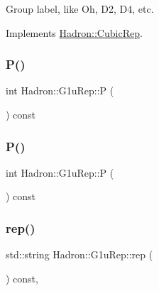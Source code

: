 Group label, like Oh, D2, D4, etc. 

Implements \mbox{\hyperlink{structHadron_1_1CubicRep_a0748f11ec87f387062c8e8981339a29c}{Hadron\+::\+Cubic\+Rep}}.

\mbox{\label{structHadron_1_1G1uRep_a44a6e8bf681031b6d490fe23dd05aaad}} 
\subsubsection{\texorpdfstring{P()}{P()}\hspace{0.1cm}{\footnotesize\ttfamily [1/2]}}
{\footnotesize\ttfamily int Hadron\+::\+G1u\+Rep\+::P (\begin{DoxyParamCaption}{ }\end{DoxyParamCaption}) const\hspace{0.3cm}{\ttfamily [inline]}}

\mbox{\label{structHadron_1_1G1uRep_a44a6e8bf681031b6d490fe23dd05aaad}} 
\subsubsection{\texorpdfstring{P()}{P()}\hspace{0.1cm}{\footnotesize\ttfamily [2/2]}}
{\footnotesize\ttfamily int Hadron\+::\+G1u\+Rep\+::P (\begin{DoxyParamCaption}{ }\end{DoxyParamCaption}) const\hspace{0.3cm}{\ttfamily [inline]}}

\mbox{\label{structHadron_1_1G1uRep_a3c25822b246f892ed1eef8aeb4ae8252}} 
\subsubsection{\texorpdfstring{rep()}{rep()}\hspace{0.1cm}{\footnotesize\ttfamily [1/5]}}
{\footnotesize\ttfamily std\+::string Hadron\+::\+G1u\+Rep\+::rep (\begin{DoxyParamCaption}{ }\end{DoxyParamCaption}) const\hspace{0.3cm}{\ttfamily [inline]}, {\ttfamily [virtual]}}



